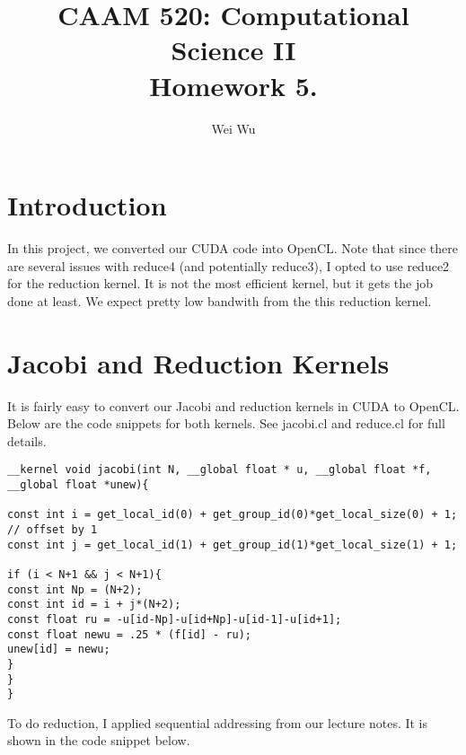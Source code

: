 \documentclass{amsart} %
\title{CAAM 520: Computational Science II \\
Homework 5.}
\author{Wei Wu}
\begin{document}

\maketitle

\section{Introduction} 

In this project, we converted our CUDA code into OpenCL. Note that since there are several issues with reduce4 (and potentially reduce3), I opted to use reduce2 for the reduction kernel. It is not the most efficient kernel, but it gets the job done at least. We expect pretty low bandwith from the this reduction kernel.  

\section{Jacobi and Reduction Kernels}

It is fairly easy to convert our Jacobi and reduction kernels in CUDA to OpenCL. Below are the code snippets for both kernels. See jacobi.cl and reduce.cl for full details.     

\begin{lstlisting}
__kernel void jacobi(int N, __global float * u, __global float *f, __global float *unew){

const int i = get_local_id(0) + get_group_id(0)*get_local_size(0) + 1; // offset by 1
const int j = get_local_id(1) + get_group_id(1)*get_local_size(1) + 1;

if (i < N+1 && j < N+1){
const int Np = (N+2);
const int id = i + j*(N+2);
const float ru = -u[id-Np]-u[id+Np]-u[id-1]-u[id+1];
const float newu = .25 * (f[id] - ru);
unew[id] = newu;
}
}
}
\end{lstlisting}   

To do reduction, I applied sequential addressing from our lecture notes. It is shown in the code snippet below.
\end{document}
